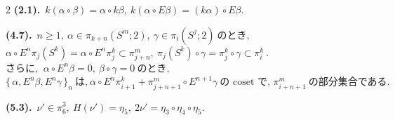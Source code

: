 \documentclass[10pt, leqno]{ltjsarticle}
\newcommand{\todai}[2][]{\{\,#2\,\}_{#1}}      %
\newcommand{\pis}[2]{\pi_{#1}(#2)}       %
\newcommand{\pit}[2]{\pi_{#1}^{#2}}
\numberwithin{equation}{section}
\theoremstyle{plain}
\theoremstyle{definition}
\theoremstyle{remark}
\begin{document}
\begin{paracol}{2}
\noindent
\textbf{(2.1).}\
\(k(\alpha\circ\beta) = \alpha\circ k\beta,\
k(\alpha\circ E\beta) = (k\alpha)\circ E\beta.\)

\noindent
\textbf{(4.7).}\
\(n\ge1, \ \alpha\in\pis{k+n}{S^m; 2},\ \gamma\in\pis{i}{S^j; 2}
    \ \text{のとき, }\)\\
\(\alpha\circ E^n\pis{j}{S^k} = \alpha\circ E^n \pit{j}{k}
  \subset \pit{j+n}{m},
  \ \pis{j}{S^k}\circ\gamma = \pit{j}{k}\circ\gamma \subset\pit{i}{k}\ . \)\\
\(\text{さらに, }\ \alpha\circ E^n\beta=0,\ \beta\circ\gamma = 0 \ \text{のとき, }\)\\
\(\todai[n]{\alpha, E^n\beta, E^n\gamma}\ \text{は,}\
  \alpha\circ E^n\pit{i+1}{k} + \pit{j+n+1}{m}\circ E^{n+1}\gamma\
  \text{の coset で, }\pit{i+n+1}{m} \ \text{の部分集合である. }\)

\noindent
\textbf{(5.3).}\
\(\nu'\in\pi_6^3,\ H(\nu')=\eta_5,\ 2\nu'=\eta_3\circ\eta_4\circ\eta_5 .\)




\end{paracol}
\end{document}
